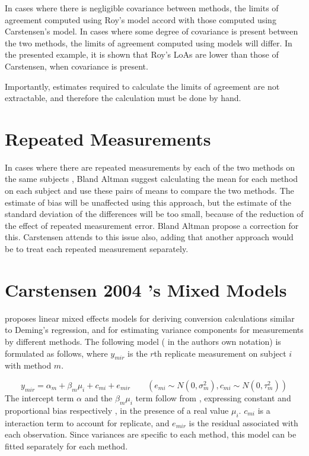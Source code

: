 \documentclass{report}
\begin{document}
In cases where there is negligible covariance between methods, the limits of agreement computed using Roy's model accord with those computed using Carstensen's model. In cases where some degree of
covariance is present between the two methods, the limits of agreement computed using models will differ. In the presented
example, it is shown that Roy's LoAs are lower than those of Carstensen, when covariance is present.

Importantly, estimates required to calculate the limits of agreement are not extractable, and therefore the calculation must
be done by hand.
\section{Repeated Measurements}

In cases where there are repeated measurements by each of the two
methods on the same subjects , Bland Altman suggest calculating
the mean for each method on each subject and use these pairs of
means to compare the two methods.
The estimate of bias will be unaffected using this approach, but
the estimate of the standard deviation of the differences will be
too small, because of the reduction of the effect of repeated
measurement error. Bland Altman propose a correction for this.
Carstensen attends to this issue also, adding that another
approach would be to treat each repeated measurement separately.
\section{Carstensen 2004 's Mixed Models}

\citet{BXC2004} proposes linear mixed effects models for deriving
conversion calculations similar to Deming's regression, and for
estimating variance components for measurements by different
methods. The following model ( in the authors own notation) is
formulated as follows, where $y_{mir}$ is the $r$th replicate
measurement on subject $i$ with method $m$.

\begin{equation}
	y_{mir}  = \alpha_{m} + \beta_{m}\mu_{i} + c_{mi} + e_{mir} \qquad
	( e_{mi} \sim N(0,\sigma^{2}_{m}), c_{mi} \sim N(0,\tau^{2}_{m}))
\end{equation}
The intercept term $\alpha$ and the $\beta_{m}\mu_{i}$ term follow
from \citet{DunnSEME}, expressing constant and proportional bias
respectively , in the presence of a real value $\mu_{i}.$
$c_{mi}$ is a interaction term to account for replicate, and
$e_{mir}$ is the residual associated with each observation.
Since variances are specific to each method, this model can be
fitted separately for each method.
\end{document}
